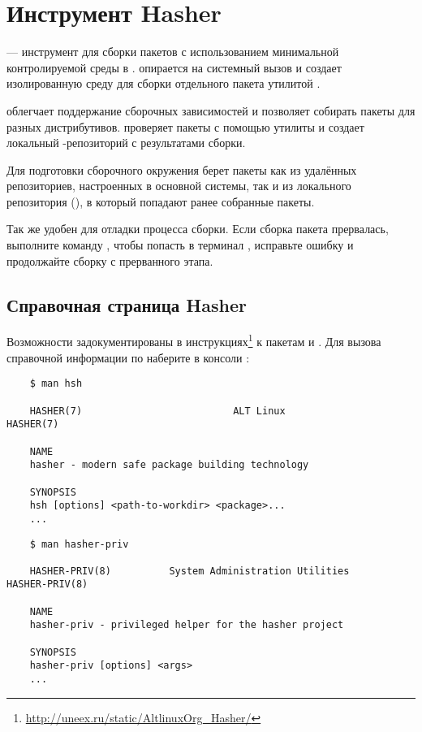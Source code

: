 \chapter{Инструмент Hasher}\label{chapter-hasher}
 --- инструмент для сборки пакетов с использованием минимальной контролируемой среды в .  опирается на системный вызов  и создает изолированную среду для сборки отдельного пакета утилитой .

 облегчает поддержание сборочных зависимостей и позволяет собирать пакеты для разных дистрибутивов.  проверяет пакеты с помощью утилиты  и создает локальный -репозиторий с результатами сборки.

Для подготовки сборочного окружения  берет пакеты как из удалённых репозиториев, настроенных в основной системы, так и из локального репозитория (), в который попадают ранее собранные пакеты.

Так же  удобен для отладки процесса сборки. Если сборка пакета прервалась, выполните команду , чтобы попасть в терминал , исправьте ошибку и продолжайте сборку с прерванного этапа.


\section{Справочная страница Hasher}
Возможности  задокументированы в инструкциях\footnote{\href{http://uneex.ru/static/AltlinuxOrg_Hasher/}{http://uneex.ru/static/AltlinuxOrg\_Hasher/}} к пакетам  и . Для вызова справочной информации по  наберите в консоли :
\begin{verbatim}
	$ man hsh
	
	HASHER(7)                          ALT Linux                         HASHER(7)
	
	NAME
	hasher - modern safe package building technology
	
	SYNOPSIS
	hsh [options] <path-to-workdir> <package>...
	...
\end{verbatim} 

\begin{verbatim}
	$ man hasher-priv
	
	HASHER-PRIV(8)          System Administration Utilities         HASHER-PRIV(8)
	
	NAME
	hasher-priv - privileged helper for the hasher project
	
	SYNOPSIS
	hasher-priv [options] <args>
	...
\end{verbatim}

